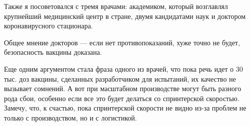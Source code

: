Также я посоветовался с тремя врачами: академиком, который возглавлял
крупнейший медицинский центр в стране, двумя кандидатами наук и доктором
коронавирусного стационара.

Общее мнение докторов — если нет противопоказаний, хуже точно не будет,
безопасность вакцины доказана.

Еще одним аргументом стала фраза одного из врачей, что пока речь идет о 30 тыс.
доз вакцины, сделанных разработчиком для испытаний, их качество не вызывает
сомнений. А вот при масштабном производстве могут быть разного рода сбои,
особенно если все это будет делаться со спринтерской скоростью. Замечу, что, к
счастью, пока спринтерской скорости не видно из-за проблем не только с
производством, но и с логистикой.
